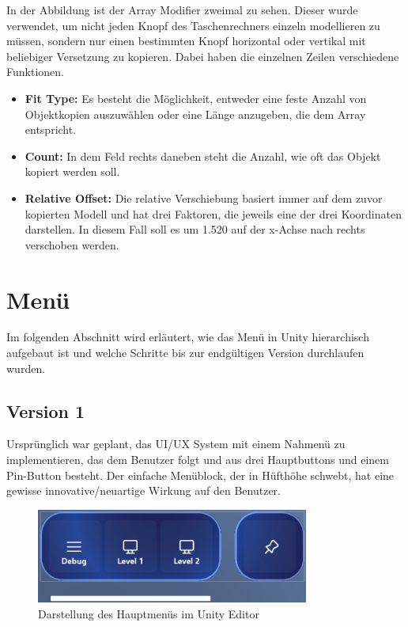 In der Abbildung ist der Array Modifier zweimal zu sehen. Dieser wurde verwendet, um nicht jeden Knopf des Taschenrechners
einzeln modellieren zu müssen, sondern nur einen bestimmten Knopf horizontal oder vertikal mit beliebiger Versetzung zu
kopieren. Dabei haben die einzelnen Zeilen verschiedene Funktionen.
\begin{itemize}
\item \textbf{Fit Type:} Es besteht die Möglichkeit, entweder eine feste Anzahl von Objektkopien auszuwählen oder eine
Länge anzugeben, die dem Array entspricht.
\item \textbf{Count:} In dem Feld rechts daneben steht die Anzahl, wie oft das Objekt kopiert werden soll.
\item \textbf{Relative Offset:} Die relative Verschiebung basiert immer auf dem zuvor kopierten Modell und hat drei
Faktoren, die jeweils eine der drei Koordinaten darstellen. In diesem Fall soll es um 1.520 auf der x-Achse nach rechts
verschoben werden.
\end{itemize}

\section{Menü}
Im folgenden Abschnitt wird erläutert, wie das Menü in Unity hierarchisch aufgebaut ist und welche Schritte bis zur
endgültigen Version durchlaufen wurden.

\subsection{Version 1}
Ursprünglich war geplant, das UI/UX System mit einem Nahmenü zu implementieren, das dem Benutzer folgt und aus drei
Hauptbuttons und einem Pin-Button besteht. Der einfache Menüblock, der in Hüfthöhe schwebt, hat eine gewisse
innovative/neuartige Wirkung auf den Benutzer.

\begin{figure}[h]
    \centering
    \includegraphics[width=0.8\textwidth]{images/menubar.png}
    \caption{Darstellung des Hauptmenüs im Unity Editor}
    \label{fig:menübar}
\end{figure}

